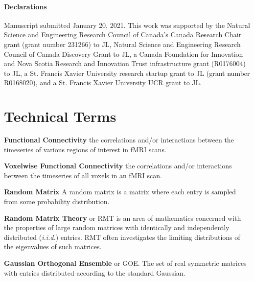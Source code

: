 \documentclass[NETN,manuscript]{stjour-new}
\begin{document}
\paragraph{Declarations}
Manuscript submitted January 20, 2021. This work was supported by the  Natural Science and
Engineering Research Council of Canada's Canada Research Chair grant (grant number 231266) to JL,
Natural Science and Engineering Research Council of Canada Discovery Grant to JL, a Canada
Foundation for Innovation and Nova Scotia Research and Innovation Trust infrastructure grant
(R0176004) to JL, a St. Francis Xavier University research startup grant to JL (grant number
R0168020), and a St. Francis Xavier University UCR grant to JL.

% 



\section{Technical Terms}

\textbf{Functional Connectivity} the correlations and/or interactions between the timeseries of
various regions of interest in fMRI scans.

\textbf{Voxelwise Functional Connectivity} the correlations and/or interactions between the
timeseries of all voxels in an fMRI scan.

\textbf{Random Matrix} A random matrix is a matrix where each entry is sampled from some probability
distribution.

\textbf{Random Matrix Theory} or RMT is an area of mathematics concerned with the properties of
large random matrices with identically and independently distributed (\emph{i.i.d.}) entries. RMT often investigates
the limiting distributions of the eigenvalues of such matrices.

\textbf{Gaussian Orthogonal Ensemble} or GOE. The set of real symmetric matrices with entries
distributed according to the standard Gaussian.
\end{document}
